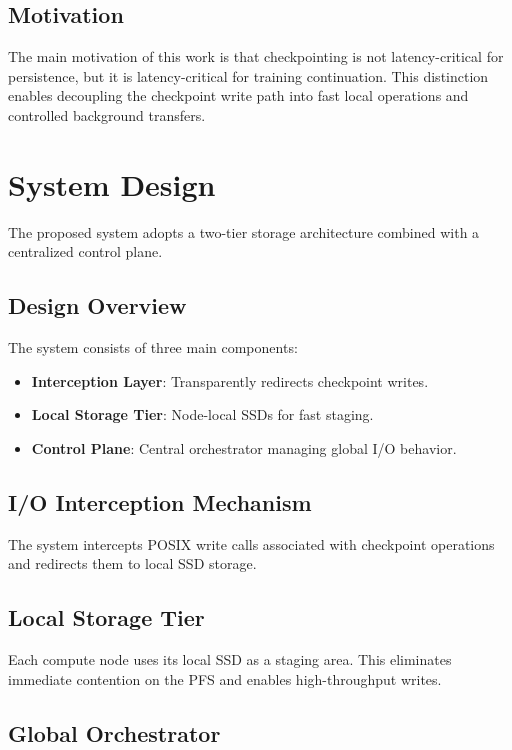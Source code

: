 \documentclass[conference,a4paper]{IEEEtran}
\begin{document}
\subsection{Motivation}

The main motivation of this work is that checkpointing is not latency-critical for persistence, but it is latency-critical for training continuation. This distinction enables decoupling the checkpoint write path into fast local operations and controlled background transfers.

\section{System Design}

The proposed system adopts a two-tier storage architecture combined with a centralized control plane.

\subsection{Design Overview}

The system consists of three main components:
\begin{itemize}
    \item \textbf{Interception Layer}: Transparently redirects checkpoint writes.
    \item \textbf{Local Storage Tier}: Node-local SSDs for fast staging.
    \item \textbf{Control Plane}: Central orchestrator managing global I/O behavior.
\end{itemize}

\subsection{I/O Interception Mechanism}

The system intercepts POSIX write calls associated with checkpoint operations and redirects them to local SSD storage.

\subsection{Local Storage Tier}

Each compute node uses its local SSD as a staging area. This eliminates immediate contention on the PFS and enables high-throughput writes.

\subsection{Global Orchestrator}
\end{document}
